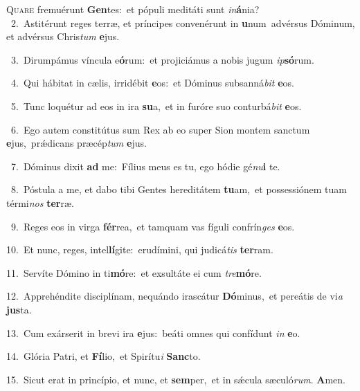\lettrine{\initial\textcolor{\initialcolor}{Q}}{uare} fremuérunt \textbf{Gen}\-tes:~\star et pópuli meditáti sunt \textit{in}\-\textbf{á}nia?\\
{\numbfont\textcolor{\numbcolor}{~2.}}~Astitérunt reges terræ, et príncipes convenérunt in \textbf{u}\-num~\star advérsus Dóminum, et advérsus Chris\textit{tum} \textbf{e}\-jus.\par
{\numbfont\textcolor{\numbcolor}{~3.}}~Dirumpámus víncula e\-\textbf{ó}\-rum:~\star et projiciámus a nobis jugum \textit{ip}\-\textbf{só}rum.\par
{\numbfont\textcolor{\numbcolor}{~4.}}~Qui hábitat in cælis, irridébit \textbf{e}\-os:~\star et Dóminus subsanná\textit{bit} \textbf{e}\-os.\par
{\numbfont\textcolor{\numbcolor}{~5.}}~Tunc loquétur ad eos in ira \textbf{su}\-a,~\star et in furóre suo conturbá\textit{bit} \textbf{e}\-os.\par
{\numbfont\textcolor{\numbcolor}{~6.}}~Ego autem constitútus sum Rex ab eo super Sion montem sanctum \textbf{e}\-jus,~\star prǽdicans præcép\textit{tum} \textbf{e}\-jus.\par
{\numbfont\textcolor{\numbcolor}{~7.}}~Dóminus dixit \textbf{ad} me:~\star Fílius meus es tu, ego hódie gé\-\textit{nu}\-\textbf{i} te.\par
{\numbfont\textcolor{\numbcolor}{~8.}}~Póstula a me, et dabo tibi Gentes hereditátem \textbf{tu}\-am,~\star et possessiónem tuam térmi\textit{nos} \textbf{ter}\-ræ.\par
{\numbfont\textcolor{\numbcolor}{~9.}}~Reges eos in virga \textbf{fér}\-rea,~\star et tamquam vas fíguli confrín\textit{ges} \textbf{e}\-os.\par
{\numbfont\textcolor{\numbcolor}{10.}}~Et nunc, reges, intel\-\textbf{lí}\-gite:~\star erudímini, qui judicá\textit{tis} \textbf{ter}\-ram.\par
{\numbfont\textcolor{\numbcolor}{11.}}~Servíte Dómino in ti\-\textbf{mó}\-re:~\star et exsultáte ei cum \textit{tre}\-\textbf{mó}re.\par
{\numbfont\textcolor{\numbcolor}{12.}}~Apprehéndite disciplínam, nequándo irascátur \textbf{Dó}\-minus,~\star et pereátis de vi\textit{a} \textbf{jus}\-ta.\par
{\numbfont\textcolor{\numbcolor}{13.}}~Cum exárserit in brevi ira \textbf{e}\-jus:~\star beáti omnes qui confídunt \textit{in} \textbf{e}\-o.\par
{\numbfont\textcolor{\numbcolor}{14.}}~Glória Patri, et \textbf{Fí}\-lio,~\star et Spirítu\textit{i} \textbf{Sanc}\-to.\par
{\numbfont\textcolor{\numbcolor}{15.}}~Sicut erat in princípio, et nunc, et \textbf{sem}\-per,~\star et in sǽcula sæculó\-\textit{rum}\-. \textbf{A}\-men.\par
